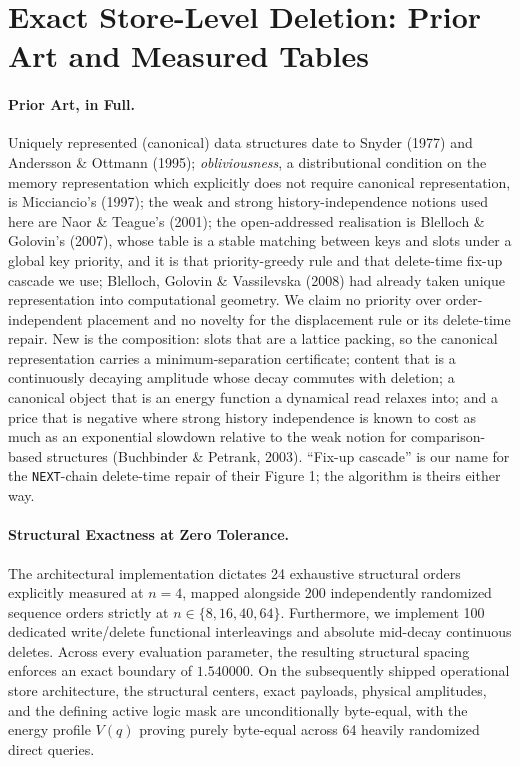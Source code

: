 \documentclass{article}
\begin{document}
\section{Exact Store-Level Deletion: Prior Art and Measured Tables}\label{app:deletion}

\paragraph{Prior Art, in Full.} Uniquely represented (canonical) data structures date to Snyder (1977) and Andersson \& Ottmann (1995); \emph{obliviousness}, a distributional condition on the memory representation which explicitly does not require canonical representation, is Micciancio's (1997); the weak and strong history-independence notions used here are Naor \& Teague's (2001); the open-addressed realisation is Blelloch \& Golovin's (2007), whose table is a stable matching between keys and slots under a global key priority, and it is that priority-greedy rule and that delete-time fix-up cascade we use; Blelloch, Golovin \& Vassilevska (2008) had already taken unique representation into computational geometry. We claim no priority over order-independent placement and no novelty for the displacement rule or its delete-time repair. New is the composition: slots that are a lattice packing, so the canonical representation carries a minimum-separation certificate; content that is a continuously decaying amplitude whose decay commutes with deletion; a canonical object that is an energy function a dynamical read relaxes into; and a price that is negative where strong history independence is known to cost as much as an exponential slowdown relative to the weak notion for comparison-based structures (Buchbinder \& Petrank, 2003). ``Fix-up cascade'' is our name for the \texttt{NEXT}-chain delete-time repair of their Figure 1; the algorithm is theirs either way.

\paragraph{Structural Exactness at Zero Tolerance.} The architectural implementation dictates 24 exhaustive structural orders explicitly measured at $n=4$, mapped alongside 200 independently randomized sequence orders strictly at $n\in\{8,16,40,64\}$. Furthermore, we implement 100 dedicated write/delete functional interleavings and absolute mid-decay continuous deletes. Across every evaluation parameter, the resulting structural spacing enforces an exact boundary of $1.540000$. On the subsequently shipped operational store architecture, the structural centers, exact payloads, physical amplitudes, and the defining active logic mask are unconditionally byte-equal, with the energy profile $V(q)$ proving purely byte-equal across 64 heavily randomized direct queries.
\end{document}

